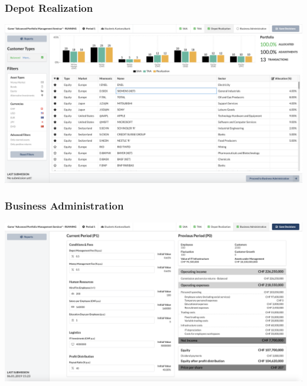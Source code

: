 \subsubsection{Depot Realization}
\begin{center}
  \includegraphics[scale=0.2]{img/application-overview/teams/05_depot_realization.png}
\end{center}

\subsubsection{Business Administration}
\begin{center}
  \includegraphics[scale=0.2]{img/application-overview/teams/06_business.png}
\end{center}
